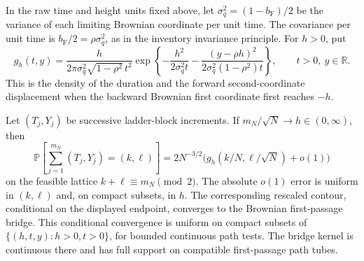 In the raw time and height units fixed above, let
$\sigma_q^2=(1-b_{\mathrm F})/2$ be the variance of each limiting
Brownian coordinate per unit time.  The covariance per unit time is
$b_{\mathrm F}/2=\rho\sigma_q^2$, as in the inventory invariance
principle.  For $h>0$, put
\begin{equation}\label{loc:hitting-density}
 g_h(t,y)=\frac{h}{2\pi\sigma_q^2\sqrt{1-\rho^2}\,t^2}
 \exp\left\{-\frac{h^2}{2\sigma_q^2t}
 -\frac{(y-\rho h)^2}{2\sigma_q^2(1-\rho^2)t}\right\},
 \qquad t>0,\ y\in\mathbb R.
\end{equation}
This is the density of the duration and the forward second-coordinate
displacement when the backward Brownian first coordinate first reaches
$-h$.

\begin{lemma}\label{loc:ladder-llt}
Let $(T_j,Y_j)$ be successive ladder-block increments.  If
$m_N/\sqrt N\to h\in(0,\infty)$, then
\begin{equation}\label{loc:lattice-llt}
 \mathbb P\left[\sum_{j=1}^{m_N}(T_j,Y_j)=(k,\ell)\right]
 =2N^{-3/2}\bigl(g_h(k/N,\ell/\sqrt N)+o(1)\bigr)
\end{equation}
on the feasible lattice $k+\ell\equiv m_N\pmod2$.  The absolute $o(1)$
error is uniform in $(k,\ell)$ and, on compact subsets, in $h$.  The
corresponding rescaled contour, conditional on the displayed endpoint,
converges to the Brownian first-passage bridge.  This conditional
convergence is uniform on compact subsets of
$\{(h,t,y):h>0,t>0\}$, for bounded continuous path tests.  The bridge
kernel is continuous there and has full support on compatible
first-passage path tubes.
\end{lemma}

